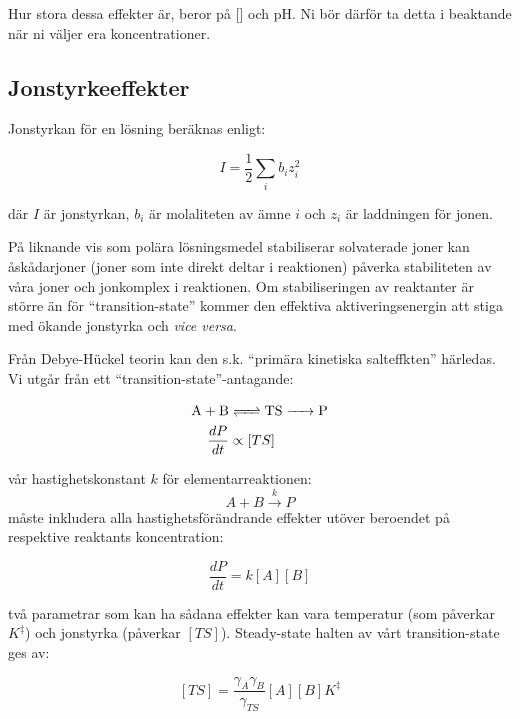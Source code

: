 Hur stora dessa effekter är, beror på [] och pH. Ni
bör därför ta detta i beaktande när ni väljer era koncentrationer.

\subsection{Jonstyrkeeffekter}
Jonstyrkan för en lösning beräknas enligt:

\begin{equation}
  \label{eq:ionic-strength}
  I = \frac{1}{2}\sum_i b_iz_i^2
\end{equation}

där $I$ är jonstyrkan, $b_i$ är molaliteten av ämne $i$ och $z_i$ är
laddningen för jonen.

På liknande vis som polära lösningsmedel stabiliserar
solvaterade joner kan åskådarjoner (joner som inte
direkt deltar i reaktionen) påverka stabiliteten av våra joner och
jonkomplex i reaktionen. Om stabiliseringen av reaktanter är större än
för ``transition-state'' kommer den effektiva aktiveringsenergin att
stiga med ökande jonstyrka och \emph{vice versa}.

Från Debye-Hückel teorin kan den s.k. ``primära kinetiska
salteffkten'' härledas. Vi utgår från ett ``transition-state''-antagande:

\begin{align}
  \label{eq:ts}
  \ce{A + B} & \ce{<=> TS -> P} \\
  \label{eq:dpdt-propto}
  \frac{dP}{dt} &\propto [TS]
\end{align}

vår hastighetskonstant $k$ för elementarreaktionen:
\begin{equation}
  A + B \overset{k}{\rightarrow} P
\end{equation}
måste inkludera alla hastighetsförändrande effekter utöver beroendet på
respektive reaktants koncentration:

\begin{equation}
  \label{eq:dpdt-explicit}
  \frac{dP}{dt} = k[A][B]
\end{equation}

två parametrar som kan ha sådana effekter kan vara temperatur (som
påverkar $K^\ddagger$) och jonstyrka (påverkar $[TS]$). Steady-state
halten av vårt transition-state ges av:

\begin{equation}
  \label{eq:ts-conc}
  [TS] = \frac{\gamma_A\gamma_B}{\gamma_{TS}}[A][B]K^\ddagger
\end{equation}

